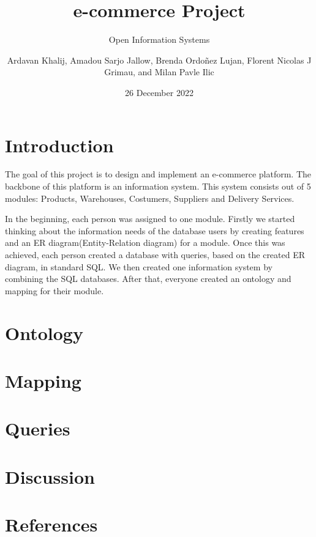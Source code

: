 \documentclass{article}
\title{e-commerce Project}
\subtitle{Open Information Systems}
\author{Ardavan Khalij, Amadou Sarjo Jallow, Brenda Ordoñez Lujan, Florent Nicolas J Grimau, and Milan Pavle Ilic}
\date{26 December 2022}
\begin{document}
\maketitle
\tableofcontents
\newpage
\section{Introduction}
The goal of this project is to design and implement an e-commerce platform. The backbone of this platform is an information system. This system consists out of 5 modules: Products, Warehouses, Costumers, Suppliers and Delivery Services.

In the beginning, each person was assigned to one module. Firstly we started thinking about the information needs of the database users by creating features and an ER diagram(Entity-Relation diagram) for a module. Once this was achieved, each person created a database with queries, based on the created ER diagram, in standard SQL. We then created one information system by combining the SQL databases. After that, everyone created an ontology and mapping for their module.

\section{Ontology}


\section{Mapping}


\section{Queries}


\section{Discussion}


\section{References}
\end{document}
